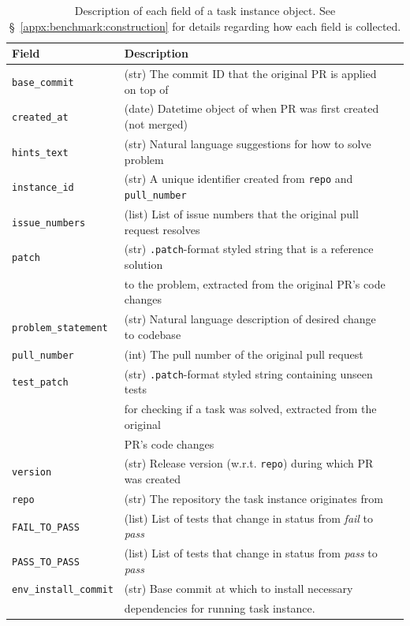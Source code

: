 \begin{table}[ht]
\centering
\begin{tabular}{l|ll}
\toprule
    Field & Description \\
\midrule
    \texttt{base\_commit} & (str) The commit ID that the original PR is applied on top of \\
    \texttt{created\_at} & (date) Datetime object of when PR was first created (not merged) \\
    \texttt{hints\_text} & (str) Natural language suggestions for how to solve problem \\
    \texttt{instance\_id} & (str) A unique identifier created from \texttt{repo} and \texttt{pull\_number} \\
    \texttt{issue\_numbers} & (list) List of issue numbers that the original pull request resolves\\
    \texttt{patch} & (str) \texttt{.patch}-format styled string that is a reference solution \\
        & to the problem, extracted from the original PR's code changes \\
    \texttt{problem\_statement} & (str) Natural language description of desired change to codebase \\
    \texttt{pull\_number} & (int) The pull number of the original pull request \\
    \texttt{test\_patch} & (str) \texttt{.patch}-format styled string containing unseen tests \\
        & for checking if a task was solved, extracted from the original \\
        & PR's code changes \\
    \texttt{version} & (str) Release version (w.r.t. \texttt{repo}) during which PR was created \\
    \texttt{repo} & (str) The repository the task instance originates from \\
    \texttt{FAIL\_TO\_PASS} & (list) List of tests that change in status from \textit{fail} to \textit{pass} \\
    \texttt{PASS\_TO\_PASS} & (list) List of tests that change in status from \textit{pass} to \textit{pass} \\
    \texttt{env\_install\_commit} & (str) Base commit at which to install necessary \\ & dependencies for running task instance. \\
\bottomrule
\end{tabular}
\caption{Description of each field of a \benchmark{} task instance object. See \S~\ref{appx:benchmark:construction} for details regarding how each field is collected.}
\label{table:task-instance-fields}
\end{table}